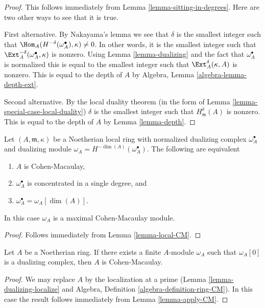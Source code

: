 \begin{proof}
This follows immediately from
Lemma \ref{lemma-sitting-in-degrees}.
Here are two other ways to see that it is true.

\medskip\noindent
First alternative. By Nakayama's lemma we see that
$\delta$ is the smallest integer such that
$\Hom_A(H^{-\delta}(\omega_A^\bullet), \kappa) \not = 0$.
In other words, it is the smallest integer such that
$\Ext_A^{-\delta}(\omega_A^\bullet, \kappa)$
is nonzero. Using Lemma \ref{lemma-dualizing} and the fact that
$\omega_A^\bullet$ is normalized this is equal to the
smallest integer such that $\Ext_A^\delta(\kappa, A)$ is
nonzero. This is equal to the depth of $A$ by
Algebra, Lemma \ref{algebra-lemma-depth-ext}.

\medskip\noindent
Second alternative. By the local duality theorem
(in the form of Lemma \ref{lemma-special-case-local-duality})
$\delta$ is the smallest integer such that $H^\delta_\mathfrak m(A)$
is nonzero. This is equal to the depth of $A$ by
Lemma \ref{lemma-depth}.
\end{proof}

\begin{lemma}
\label{lemma-apply-CM}
Let $(A, \mathfrak m, \kappa)$ be a Noetherian local ring
with normalized dualizing complex $\omega_A^\bullet$
and dualizing module $\omega_A = H^{-\dim(A)}(\omega_A^\bullet)$.
The following are equivalent
\begin{enumerate}
\item $A$ is Cohen-Macaulay,
\item $\omega_A^\bullet$ is concentrated in a single degree, and
\item $\omega_A^\bullet = \omega_A[\dim(A)]$.
\end{enumerate}
In this case $\omega_A$ is a maximal Cohen-Macaulay module.
\end{lemma}

\begin{proof}
Follows immediately from Lemma \ref{lemma-local-CM}.
\end{proof}

\begin{lemma}
\label{lemma-has-dualizing-module-CM}
Let $A$ be a Noetherian ring. If there exists a finite $A$-module
$\omega_A$ such that $\omega_A[0]$ is a dualizing complex, then
$A$ is Cohen-Macaulay.
\end{lemma}

\begin{proof}
We may replace $A$ by the localization at a prime
(Lemma \ref{lemma-dualizing-localize} and
Algebra, Definition \ref{algebra-definition-ring-CM}).
In this case the result follows immediately from
Lemma \ref{lemma-apply-CM}.
\end{proof}




